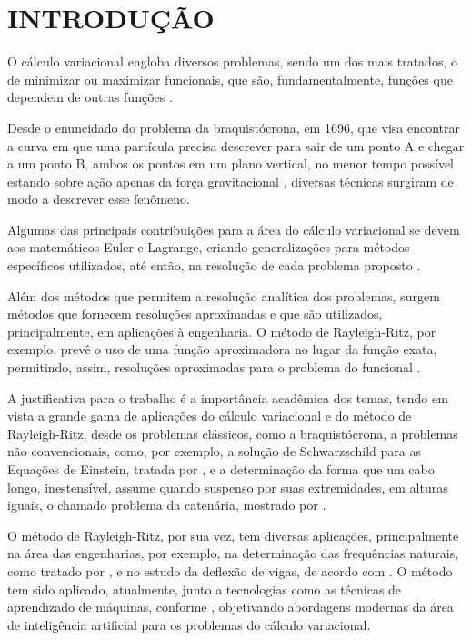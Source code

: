 \documentclass[
	12pt,				%
	openright,			%
    twoside,			%
	a4paper,			%
	chapter=TITLE,		%
	english,			%
	french,				%
	spanish,			%
	brazil				%
	]{abntex2}
\numberwithin{lema}{chapter}
\numberwithin{teorema}{chapter}
\numberwithin{definicao}{chapter}
\numberwithin{exemplo}{chapter}
\numberwithin{figure}{chapter}
\begin{document}
\chapter*[INTRODUÇÃO]{INTRODUÇÃO}

O cálculo variacional engloba diversos problemas, sendo um dos mais tratados, o de minimizar ou maximizar funcionais, que são, fundamentalmente, funções que dependem de outras funções \cite{mefassan}.

Desde o enuncidado do problema da braquistócrona, em 1696, que visa encontrar a curva em que uma partícula precisa descrever para sair de um ponto A e chegar a um ponto B, ambos os pontos em um plano vertical, no menor tempo possível estando sobre ação apenas da força gravitacional \cite{calcvar}, diversas técnicas surgiram de modo a descrever esse fenômeno.

Algumas das principais contribuições para a área do cálculo variacional se devem aos matemáticos Euler e Lagrange, criando generalizações para métodos específicos utilizados, até então, na resolução de cada problema proposto \cite{hist_courant}.

Além dos métodos que permitem a resolução analítica dos problemas, surgem métodos que fornecem resoluções aproximadas e que são utilizados, principalmente, em aplicações à engenharia. O método de Rayleigh-Ritz, por exemplo, prevê o uso de uma função aproximadora no lugar da função exata, permitindo, assim, resoluções aproximadas para o problema do funcional \cite{mefassan}.

A justificativa para o trabalho é a importância acadêmica dos temas, tendo em vista a grande gama de aplicações do cálculo variacional e do método de Rayleigh-Ritz, desde os problemas clássicos, como a braquistócrona, a problemas não convencionais, como, por exemplo, a solução de Schwarzschild para as Equações de Einstein, tratada por , e a determinação da forma que um cabo longo, inestensível, assume quando suspenso por suas extremidades, em alturas iguais, o chamado problema da catenária, mostrado por . 

O método de Rayleigh-Ritz, por sua vez, tem diversas aplicações, principalmente na área das engenharias, por exemplo, na determinação das frequências naturais, como tratado por , e no estudo da deflexão de vigas, de acordo com . O método tem sido aplicado, atualmente, junto a tecnologias como as técnicas de aprendizado de máquinas, conforme , objetivando abordagens modernas da área de inteligência artificial para os problemas do cálculo variacional. 
\end{document}
